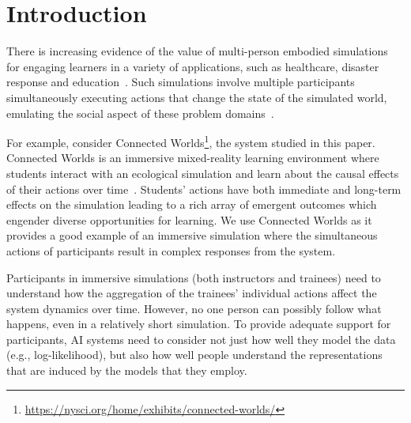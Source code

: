 \documentclass[letterpaper]{article} %
\newcommand{\kibitz}[2]{\ifnum\Comments=1{\textcolor{#1}{#2}}\fi}
\newcommand{\nh}[1]{\kibitz{blue}{[NH:#1]}}
\newcommand{\bjg}[1]{\kibitz{purple}{[BG:#1]}}
\begin{document}


\section{Introduction}
\label{sec:introduction}
There is increasing evidence of the value of multi-person embodied simulations for engaging learners in a variety of
applications, such as healthcare, disaster response and education~\cite{alinier2014immersive,amir2013plan}.
Such simulations involve multiple participants simultaneously executing actions that change the state of the simulated world, emulating the social aspect of these problem domains~\cite{smordal2012hybrid}.

For example, consider Connected Worlds\footnote{\url{https://nysci.org/home/exhibits/connected-worlds/}},  the system studied in this paper. Connected Worlds is
an immersive mixed-reality learning environment
where students interact with an ecological simulation and learn about the causal effects of their actions over time~\cite{mallavarapu2019connect}.
Students' actions have both immediate and long-term effects on the simulation leading to a rich array of emergent outcomes which engender diverse opportunities for learning.
We use Connected Worlds as it provides a good example of an immersive simulation where the simultaneous actions of participants result in complex responses from the system.

Participants in immersive simulations (both instructors and trainees) need to understand how the aggregation of the trainees' individual actions affect the system dynamics over time.
However, no one person can possibly follow what happens, even in a relatively short simulation.
To provide adequate support for participants, AI systems need to consider not just how well they model the data (e.g., log-likelihood), but also how well people understand the representations that are induced by the models that they employ.
\end{document}
